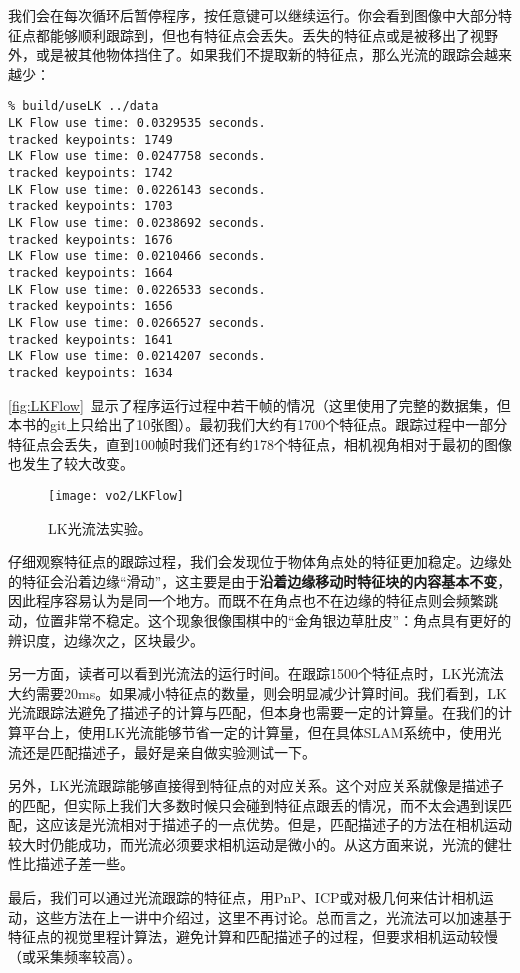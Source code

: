 我们会在每次循环后暂停程序，按任意键可以继续运行。你会看到图像中大部分特征点都能够顺利跟踪到，但也有特征点会丢失。丢失的特征点或是被移出了视野外，或是被其他物体挡住了。如果我们不提取新的特征点，那么光流的跟踪会越来越少：

\clearpage
\begin{lstlisting}
% build/useLK ../data
LK Flow use time: 0.0329535 seconds.
tracked keypoints: 1749
LK Flow use time: 0.0247758 seconds.
tracked keypoints: 1742
LK Flow use time: 0.0226143 seconds.
tracked keypoints: 1703
LK Flow use time: 0.0238692 seconds.
tracked keypoints: 1676
LK Flow use time: 0.0210466 seconds.
tracked keypoints: 1664
LK Flow use time: 0.0226533 seconds.
tracked keypoints: 1656
LK Flow use time: 0.0266527 seconds.
tracked keypoints: 1641
LK Flow use time: 0.0214207 seconds.
tracked keypoints: 1634
\end{lstlisting}

\autoref{fig:LKFlow}~显示了程序运行过程中若干帧的情况（这里使用了完整的数据集，但本书的git上只给出了10张图）。最初我们大约有1700个特征点。跟踪过程中一部分特征点会丢失，直到100帧时我们还有约178个特征点，相机视角相对于最初的图像也发生了较大改变。

\begin{figure}[!ht]
	\centering
	\texttt{[image: vo2/LKFlow]}
	\caption{LK光流法实验。}
	\label{fig:LKFlow}
\end{figure}

仔细观察特征点的跟踪过程，我们会发现位于物体角点处的特征更加稳定。边缘处的特征会沿着边缘“滑动”，这主要是由于\textbf{沿着边缘移动时特征块的内容基本不变}，因此程序容易认为是同一个地方。而既不在角点也不在边缘的特征点则会频繁跳动，位置非常不稳定。这个现象很像围棋中的“金角银边草肚皮”：角点具有更好的辨识度，边缘次之，区块最少。

另一方面，读者可以看到光流法的运行时间。在跟踪1500个特征点时，LK光流法大约需要20ms。如果减小特征点的数量，则会明显减少计算时间。我们看到，LK光流跟踪法避免了描述子的计算与匹配，但本身也需要一定的计算量。在我们的计算平台上，使用LK光流能够节省一定的计算量，但在具体SLAM系统中，使用光流还是匹配描述子，最好是亲自做实验测试一下。

另外，LK光流跟踪能够直接得到特征点的对应关系。这个对应关系就像是描述子的匹配，但实际上我们大多数时候只会碰到特征点跟丢的情况，而不太会遇到误匹配，这应该是光流相对于描述子的一点优势。但是，匹配描述子的方法在相机运动较大时仍能成功，而光流必须要求相机运动是微小的。从这方面来说，光流的健壮性比描述子差一些。

最后，我们可以通过光流跟踪的特征点，用PnP、ICP或对极几何来估计相机运动，这些方法在上一讲中介绍过，这里不再讨论。总而言之，光流法可以加速基于特征点的视觉里程计算法，避免计算和匹配描述子的过程，但要求相机运动较慢（或采集频率较高）。

